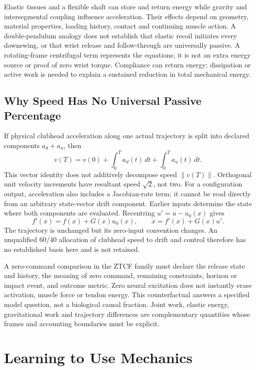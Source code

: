 Elastic tissues and a flexible shaft can store and return energy while
gravity and intersegmental coupling influence acceleration. Their effects
depend on geometry, material properties, loading history, contact and
continuing muscle action. A double-pendulum analogy does not establish that
elastic recoil initiates every downswing, or that wrist release and
follow-through are universally passive. A rotating-frame centrifugal term
represents the equations; it is not an extra energy source or proof of zero
wrist torque. Compliance can return energy; dissipation or active work is
needed to explain a sustained reduction in total mechanical energy.

\subsection{Why Speed Has No Universal Passive Percentage}

If physical clubhead acceleration along one actual trajectory is split into
declared components $a_d+a_u$, then
\begin{equation}
 v(T)=v(0)+\int_0^T a_d(t)\,dt+\int_0^T a_u(t)\,dt.
\end{equation}
This vector identity does not additively decompose speed $\|v(T)\|$.
Orthogonal unit velocity increments have resultant speed $\sqrt2$, not two.
For a configuration output, acceleration also includes a Jacobian-rate term;
it cannot be read directly from an arbitrary state-vector drift component.
Earlier inputs determine the state where both components are evaluated.
Recentring $u'=u-u_0(x)$ gives
\begin{equation}
 f'(x)=f(x)+G(x)u_0(x),\qquad \dot x=f'(x)+G(x)u'.
\end{equation}
The trajectory is unchanged but its zero-input convention changes. An
unqualified 60/40 allocation of clubhead speed to drift and control therefore
has no established basis here and is not retained.

A zero-command comparison in the ZTCF family must declare the release state
and history, the meaning of zero command, remaining constraints, horizon or
impact event, and outcome metric. Zero neural excitation does not instantly
erase activation, muscle force or tendon energy. This counterfactual answers
a specified model question, not a biological causal fraction. Joint work,
elastic energy, gravitational work and trajectory differences are complementary
quantities whose frames and accounting boundaries must be explicit.

\section{Learning to Use Mechanics}

